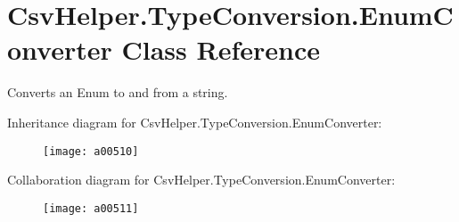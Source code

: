 \hypertarget{a00096}{\section{Csv\-Helper.\-Type\-Conversion.\-Enum\-Converter Class Reference}
\label{a00096}
}


Converts an Enum to and from a string.  




Inheritance diagram for Csv\-Helper.\-Type\-Conversion.\-Enum\-Converter\-:
\nopagebreak
\begin{figure}[H]
\begin{center}
\leavevmode
\texttt{[image: a00510]}
\end{center}
\end{figure}


Collaboration diagram for Csv\-Helper.\-Type\-Conversion.\-Enum\-Converter\-:
\nopagebreak
\begin{figure}[H]
\begin{center}
\leavevmode
\texttt{[image: a00511]}
\end{center}
\end{figure}
